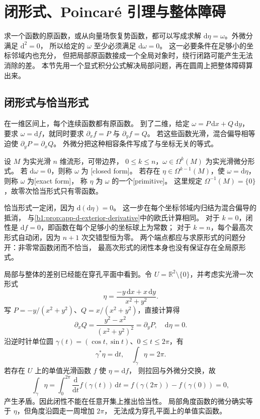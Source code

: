 \section{闭形式、Poincaré 引理与整体障碍}
\label{b1:sec:E105}

求一个函数的原函数，或从向量场恢复势函数，都可以写成求解
\(\mathrm d\eta=\omega\)。外微分满足 \(\mathrm d^2=0\)，
所以给定的 \(\omega\) 至少必须满足 \(\mathrm d\omega=0\)。
这一必要条件在足够小的坐标邻域内也充分，
但把局部原函数接成一个全局对象时，绕行闭路可能产生无法消除的差。
本节先用一个显式积分公式解决局部问题，再在圆周上把整体障碍算出来。

\subsection{闭形式与恰当形式}
\label{b1:subsec:E10501}

在一维区间上，每个连续函数都有原函数。
到了二维，给定 \(\omega=P\,\mathrm dx+Q\,\mathrm dy\)，
要求 \(\omega=\mathrm df\)，就同时要求
\(\partial_xf=P\) 与 \(\partial_yf=Q\)。
若这些函数光滑，混合偏导相等迫使 \(\partial_yP=\partial_xQ\)。
外微分把这种相容条件写成了与坐标无关的等式。

\begin{definition}\label{b1:def:E-closed-exact}
设 \(M\) 为实光滑 \(n\) 维流形，可带边界，
\(0\leq k\leq n\)，\(\omega\in\Omega^k(M)\) 为实光滑微分形式。
若 \(\mathrm d\omega=0\)，则称 \(\omega\) 为
[closed form]。
若存在 \(\eta\in\Omega^{k-1}(M)\)，使 \(\omega=\mathrm d\eta\)，
则称 \(\omega\) 为[exact form]，
称 \(\eta\) 为 \(\omega\) 的一个[primitive]。
这里规定 \(\Omega^{-1}(M)=\{0\}\)，故零次恰当形式只有零函数。
\end{definition}

恰当形式一定闭，因为 \(\mathrm d(\mathrm d\eta)=0\)。
这一步在每个坐标邻域内归结为混合偏导的抵消，
与\cref{b1:prop:app-d-exterior-derivative}中的欧氏计算相同。
对于 \(k=0\)，闭性是 \(\mathrm df=0\)，即函数在每个足够小的坐标球上为常数；
对于 \(k=n\)，每个最高次形式自动闭，因为 \(n+1\) 次交错型恒为零。
两个端点都应与求原形式的问题分开：非零常函数闭而不恰当，
最高次形式的闭性本身也没有保证存在全局原形式。

\ProseParagraphBreak

局部与整体的差别已经能在穿孔平面中看到。令
\(U=\mathbb R^2\setminus\{0\}\)，并考虑实光滑一次形式
\begin{equation}\label{b1:eq:E-angular-form}
 \eta=\frac{-y\,\mathrm dx+x\,\mathrm dy}{x^2+y^2}.
\end{equation}
写 \(P=-y/(x^2+y^2)\)、\(Q=x/(x^2+y^2)\)，直接计算得
\[
 \partial_xQ=\frac{y^2-x^2}{(x^2+y^2)^2}
             =\partial_yP,
 \quad \mathrm d\eta=0.
\]
沿逆时针单位圆 \(\gamma(t)=(\cos t,\sin t)\)、\(0\leq t\leq2\pi\)，有
\[
 \gamma^*\eta=\mathrm dt,
 \quad \int_\gamma\eta=2\pi.
\]
若存在 \(U\) 上的单值光滑函数 \(f\) 使 \(\eta=\mathrm df\)，
则拉回与外微分交换，故
\[
 \int_\gamma\eta
 =\int_0^{2\pi}\frac{\mathrm d}{\mathrm dt}f(\gamma(t))\,\mathrm dt
 =f(\gamma(2\pi))-f(\gamma(0))=0,
\]
产生矛盾。因此闭性不能在任意开集上推出恰当性。
局部角度函数的微分确实等于 \(\eta\)，但角度沿圆走一周增加 \(2\pi\)，
无法成为穿孔平面上的单值实函数。

